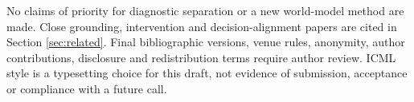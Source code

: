 No claims of priority for diagnostic separation or a new world-model method
are made. Close grounding, intervention and decision-alignment papers are
cited in Section \ref{sec:related}. Final bibliographic versions, venue rules,
anonymity, author contributions, disclosure and redistribution terms require
author review. ICML style is a typesetting choice for this draft, not evidence
of submission, acceptance or compliance with a future call.